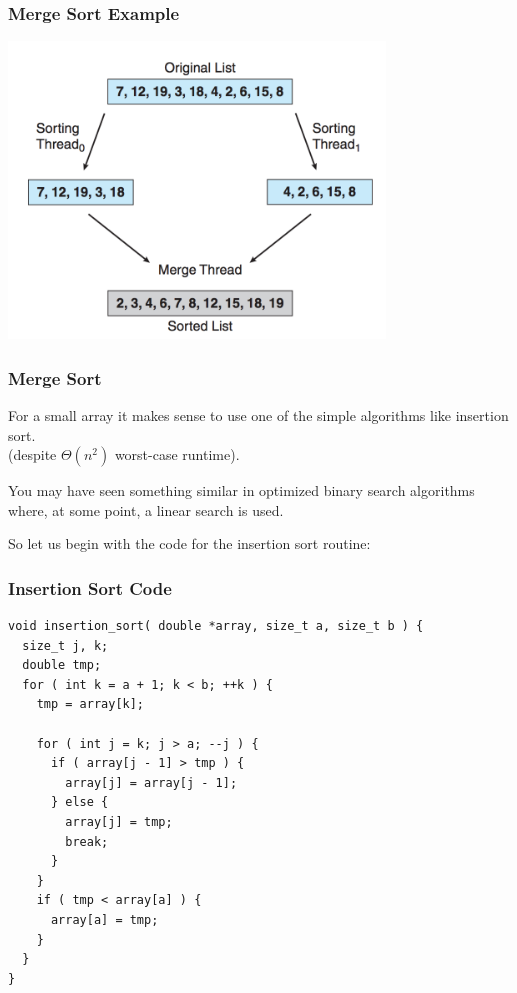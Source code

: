  
\begin{frame}
\frametitle{Merge Sort Example}

\begin{center}
	\includegraphics[width=0.75\textwidth]{images/multithread-sort.png}
\end{center}


\end{frame}
 
\begin{frame}
\frametitle{Merge Sort}

For a small array it makes sense to use one of the simple algorithms like insertion sort.\\
\quad  (despite $\Theta(n^{2})$ worst-case runtime). 

You may have seen something similar in optimized binary search algorithms where, at some point, a linear search is used. 

So let us begin with the code for the insertion sort routine:

\end{frame}
 
\begin{frame}[fragile]
\frametitle{Insertion Sort Code}

\begin{verbatim}
void insertion_sort( double *array, size_t a, size_t b ) {
  size_t j, k;
  double tmp;
  for ( int k = a + 1; k < b; ++k ) { 
    tmp = array[k];
    
    for ( int j = k; j > a; --j ) {
      if ( array[j - 1] > tmp ) {
        array[j] = array[j - 1];
      } else {
        array[j] = tmp;
        break;
      }
    }
    if ( tmp < array[a] ) {
      array[a] = tmp;
    }
  } 
}
\end{verbatim}

\end{frame}
 
